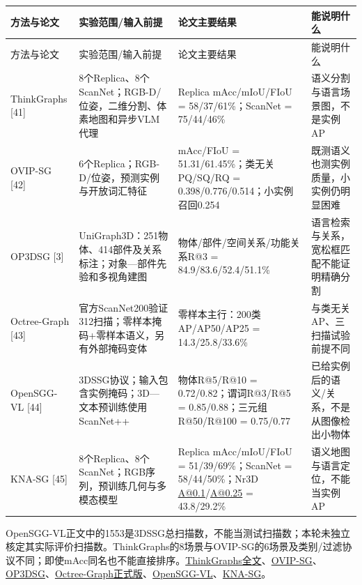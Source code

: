 \documentclass[UTF8,fontset=fandol]{ctexart}
\begin{document}
{\small
\begin{longtable}{|p{}|p{}|p{}|p{}|}
\hline
方法与论文 & 实验范围/输入前提 & 论文主要结果 & 能说明什么 \\ \hline
\endfirsthead
\hline
方法与论文 & 实验范围/输入前提 & 论文主要结果 & 能说明什么 \\ \hline
\endhead
ThinkGraphs [41] & 8个Replica、8个ScanNet；RGB-D/位姿，二维分割、体素地图和异步VLM代理 & Replica mAcc/mIoU/FIoU = 58/37/61\%；ScanNet = 75/44/46\% & 语义分割与语言场景图，不是实例AP \\ \hline
OVIP-SG [42] & 6个Replica；RGB-D/位姿，预测实例与开放词汇特征 & mAcc/FIoU = 51.31/61.45\%；类无关PQ/SQ/RQ = 0.398/0.776/0.514；小实例召回0.254 & 既测语义也测实例质量，小实例仍明显困难 \\ \hline
OP3DSG [3] & UniGraph3D：251物体、414部件及关系标注；对象—部件先验和多视角建图 & 物体/部件/空间关系/功能关系R@3 = 84.9/83.6/52.4/51.1\% & 语言检索与关系，宽松框匹配不能证明精确分割 \\ \hline
Octree-Graph [43] & 官方ScanNet200验证312扫描；零样本掩码+零样本语义，另有外部掩码变体 & 零样本主行：200类AP/AP50/AP25 = 14.3/25.8/33.6\% & 与类无关AP、三扫描试验前提不同 \\ \hline
OpenSGG-VL [44] & 3DSSG协议；输入包含实例掩码；3D—文本预训练使用ScanNet++ & 物体R@5/R@10 = 0.72/0.82；谓词R@3/R@5 = 0.85/0.88；三元组R@50/R@100 = 0.75/0.77 & 已给实例后的语义/关系，不是从图像检出小物体 \\ \hline
KNA-SG [45] & 8个Replica、8个ScanNet；RGB序列，预训练几何与多模态模型 & Replica mAcc/mIoU/FIoU = 51/39/69\%；ScanNet = 58/44/50\%；Nr3D \href{mailto:A@0.1}{A@0.1}/\href{mailto:A@0.25}{A@0.25} = 43.8/29.2\% & 语义地图与语言定位，不能当实例AP \\ \hline
\end{longtable}
}

OpenSGG-VL正文中的1553是3DSSG总扫描数，不能当测试扫描数；本轮未独立核定其实际评价扫描数。ThinkGraphs的8场景与OVIP-SG的6场景及类别/过滤协议不同；即使mAcc同名也不能直接排序。\href{https://arxiv.org/html/2606.31471v1}{ThinkGraphs全文}、\href{https://arxiv.org/html/2608.17633v5}{OVIP-SG}、\href{https://arxiv.org/html/2606.29786v1}{OP3DSG}、\href{https://openaccess.thecvf.com/content/ICCV2025/papers/Wang\_Open-Vocabulary\_Octree-Graph\_for\_3D\_Scene\_Understanding\_ICCV\_2025\_paper.pdf}{Octree-Graph正式版}、\href{https://doi.org/10.1145/3805622.3810857}{OpenSGG-VL}、\href{https://www.mdpi.com/2227-7080/14/7/425}{KNA-SG}。
\end{document}
